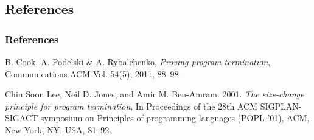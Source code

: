 \begin{frame}

\section{References}

\frametitle{References}

\begin{thebibliography}{2}

 B. Cook, A. Podelski \& A.  Rybalchenko,
\emph{Proving program termination}, Communications ACM Vol. 54(5), 2011, 88--98.

 Chin Soon Lee, Neil D. Jones, and Amir
M. Ben-Amram. 2001. \emph{The size-change principle for program termination},
In Proceedings of the 28th ACM SIGPLAN-SIGACT symposium on Principles of
programming languages (POPL '01), ACM, New York, NY, USA, 81--92.

\end{thebibliography}

\end{frame}
